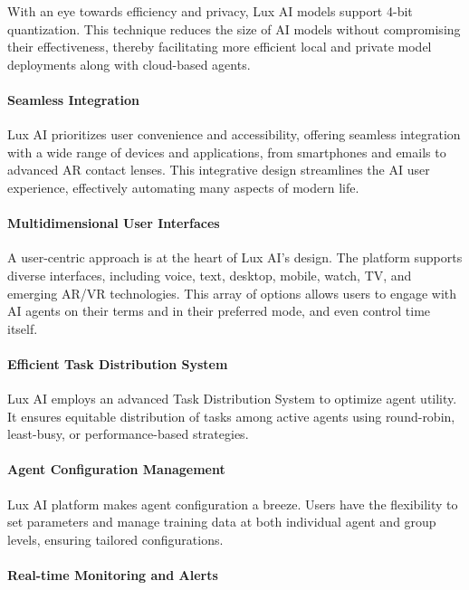 \documentclass[11pt]{article}
\begin{document}
With an eye towards efficiency and privacy, Lux AI models support 4-bit quantization. This technique reduces the size of AI models without compromising their effectiveness, thereby facilitating more efficient local and private model deployments along with cloud-based agents.


\paragraph{Seamless Integration}

Lux AI prioritizes user convenience and accessibility, offering seamless integration with a wide range of devices and applications, from smartphones and emails to advanced AR contact lenses. This integrative design streamlines the AI user experience, effectively automating many aspects of modern life.


\paragraph{Multidimensional User Interfaces}

A user-centric approach is at the heart of Lux AI's design. The platform supports diverse interfaces, including voice, text, desktop, mobile, watch, TV, and emerging AR/VR technologies. This array of options allows users to engage with AI agents on their terms and in their preferred mode, and even control time itself.


\paragraph{Efficient Task Distribution System}

Lux AI employs an advanced Task Distribution System to optimize agent utility. It ensures equitable distribution of tasks among active agents using round-robin, least-busy, or performance-based strategies.


\paragraph{Agent Configuration Management}

Lux AI platform makes agent configuration a breeze. Users have the flexibility to set parameters and manage training data at both individual agent and group levels, ensuring tailored configurations.


\paragraph{Real-time Monitoring and Alerts}
\end{document}
